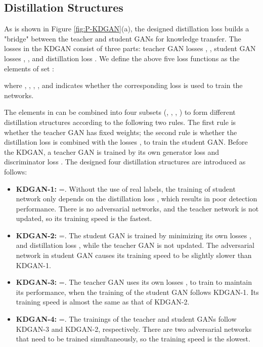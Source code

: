 \documentclass{article}
\begin{document}
	
	
	
	
	
	\subsection{Distillation Structures}
	\label{sec:3.2}
	As is shown in Figure \ref{fig:P-KDGAN}(a), the designed distillation loss  builds a "bridge" between the teacher and student GANs for knowledge transfer. The losses in the KDGAN consist of three parts: teacher GAN losses , , student GAN losses , , and distillation loss .  We define the above five loss functions as the elements of set :
	
	
	where , , , , and    indicates whether the corresponding loss is used to train the networks.
	
	
	The elements in  can be combined into four subsets (, , , ) to form different distillation structures according to the following two rules. The first rule is whether the teacher GAN has fixed weights; the second rule is whether the distillation loss  is combined with the losses ,  to train the student GAN. Before the KDGAN, a teacher GAN is trained by its own generator loss  and discriminator loss . The designed four distillation structures are introduced as follows:
	
	
	\begin{itemize}
		\item \textbf{KDGAN-\normalsize{\textcircled{\footnotesize{1}}}:} =. Without the use of real labels, the training of student network only depends on the distillation loss , which results in poor detection performance. There is no adversarial networks, and the teacher network is not updated, so its training speed is the fastest. 
		
		\item \textbf{KDGAN-\normalsize{\textcircled{\footnotesize{2}}}:} =. The student GAN is trained by minimizing its own losses ,  and distillation loss , while the teacher GAN is not updated. The adversarial network in student GAN causes its training speed to be slightly slower than KDGAN-\normalsize{\textcircled{\footnotesize{1}}}.
		
		\item \textbf{KDGAN-\normalsize{\textcircled{\footnotesize{3}}}:} =. The teacher GAN uses its own losses ,  to train to maintain its performance, when the training of the student GAN follows KDGAN-\normalsize{\textcircled{\footnotesize{1}}}. Its training speed is almost the same as that of KDGAN-\normalsize{\textcircled{\footnotesize{2}}}.
		
		\item \textbf{KDGAN-\normalsize{\textcircled{\footnotesize{4}}}:} =. The trainings of the teacher and student GANs follow KDGAN-\normalsize{\textcircled{\footnotesize{3}}} and KDGAN-\normalsize{\textcircled{\footnotesize{2}}}, respectively. There are two adversarial networks that need to be trained simultaneously, so the training speed is the slowest.
	\end{itemize}
	
\end{document}
